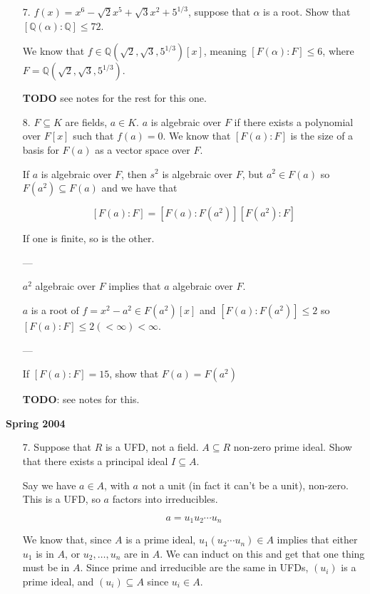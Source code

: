 \documentclass[12pt]{article}
\def\Q{{\mathbb Q}}
\def\TODO{\color{red}\textbf{TODO}\color{black}}
\theoremstyle{remark}
\theoremstyle{remark}
\theoremstyle{remark}
\theoremstyle{remark}
\theoremstyle{remark}
\begin{document}
\begin{enumerate}
  \item[7.] $f(x) = x^6 - \sqrt{2}x^5 + \sqrt{3}x^2 + 5^{1 / 3}$, suppose that
    $\alpha$ is a root. Show that $[\Q(\alpha) : \Q] \le 72$.

    We know that $f \in \Q(\sqrt{2}, \sqrt{3}, 5^{1/3})[x]$, meaning $[F(\alpha)
    : F] \le 6$, where $F = \Q(\sqrt{2}, \sqrt{3}, 5^{1/3})$.

    \TODO{} see notes for the rest for this one.

  \item[8.] $F \subseteq K$ are fields, $a \in K$. $a$ is algebraic over $F$ if
    there exists a polynomial over $F[x]$ such that $f(a) = 0$. We know that
    $[F(a) : F]$ is the size of a basis for $F(a)$ as a vector space over $F$.

    If $a$ is algebraic over $F$, then $s^2$ is algebraic over $F$, but $a^2 \in
    F(a)$ so $F(a^2) \subseteq F(a)$ and we have that

    \[
      [F(a) : F] = [F(a) : F(a^2)][F(a^2) : F]
    \]

    If one is finite, so is the other.

    ---

    $a^2$ algebraic over $F$ implies that $a$ algebraic over $F$.

    $a$ is a root of $f = x^2 - a^2 \in F(a^2)[x]$ and $[F(a) : F(a^2)] \le 2$
    so $[F(a) : F] \le 2 (< \infty) < \infty$.

    ---

    If $[F(a) : F] = 15$, show that $F(a) = F(a^2)$

    \TODO: see notes for this.

\end{enumerate}

{\bf Spring 2004}

\begin{enumerate}
  \item[7.] Suppose that $R$ is a UFD, not a field. $A \subseteq R$ non-zero
    prime ideal. Show that there exists a principal ideal $I \subseteq A$.

    Say we have $a \in A$, with $a$ not a unit (in fact it can't be a unit),
    non-zero. This is a UFD, so $a$ factors into irreducibles.

    \[
      a = u_1 u_2 \cdots u_n
    \]

    We know that, since $A$ is a prime ideal, $u_1 (u_2 \cdots u_n) \in A$
    implies that either $u_1$ is in $A$, or $u_2, \dots, u_n$ are in $A$. We can
    induct on this and get that one thing must be in $A$. Since prime and
    irreducible are the same in UFDs, $(u_i)$ is a prime ideal, and $(u_i)
    \subseteq A$ since $u_i \in A$.
\end{enumerate}
\end{document}
